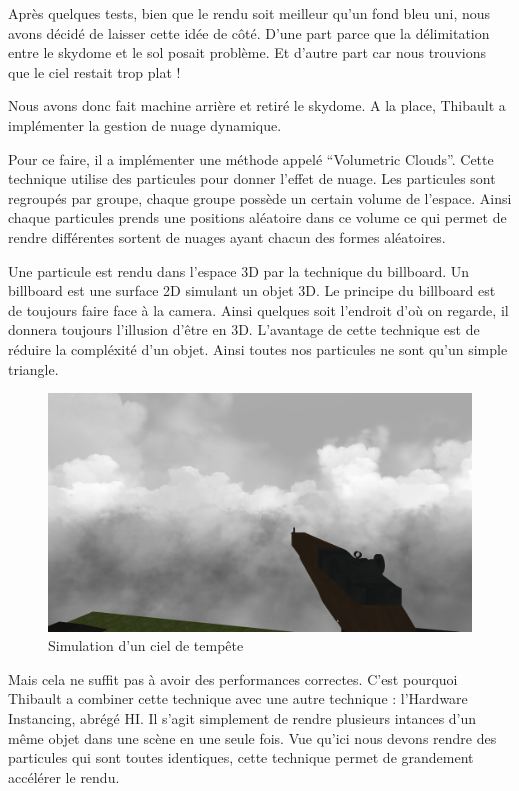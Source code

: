 \documentclass[11pt]{report}
\begin{document}
Après quelques tests, bien que le rendu soit meilleur qu’un fond bleu uni, nous avons décidé de laisser cette idée de côté.  D’une part parce que la délimitation entre le skydome et le sol posait problème. Et d’autre part car nous trouvions que le ciel restait trop plat !

Nous avons donc fait machine arrière et retiré le skydome. A la place, Thibault a implémenter la gestion de nuage dynamique.

Pour ce faire, il a implémenter une méthode appelé ``Volumetric Clouds''. Cette technique utilise des particules pour donner l'effet de nuage. Les particules sont regroupés par groupe, chaque groupe possède un certain volume de l'espace. Ainsi chaque particules prends une positions aléatoire dans ce volume ce qui permet de rendre différentes sortent de nuages ayant chacun des formes aléatoires.

Une particule est rendu dans l'espace 3D par la technique du billboard. Un billboard est une surface 2D simulant un objet 3D. Le principe du billboard est de toujours faire face à la camera. Ainsi quelques soit l'endroit d'où on regarde, il donnera toujours l'illusion d'être en 3D. L'avantage de cette technique est de réduire la compléxité d'un objet. Ainsi toutes nos particules ne sont qu'un simple triangle.

\begin{figure}[htbp]
\centering
\includegraphics[scale=0.13]{ciel_vue_haut.png}
\caption{Simulation d'un ciel de tempête}
\end{figure}

Mais cela ne suffit pas à avoir des performances correctes. C'est pourquoi Thibault a combiner cette technique avec une autre technique : l'Hardware Instancing, abrégé HI. Il s'agit simplement de rendre plusieurs intances d'un même objet dans une scène en une seule fois. Vue qu'ici nous devons rendre des particules qui sont toutes identiques, cette technique permet de grandement accélérer le rendu.
\end{document}
